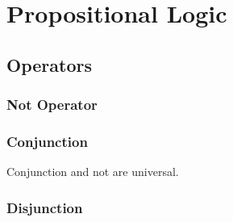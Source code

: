 \chapter{Propositional Logic}
\thispagestyle{headings}
\section{Operators}
\subsection{Not Operator}
\subsection{Conjunction}
Conjunction and not are universal.
\subsection{Disjunction }